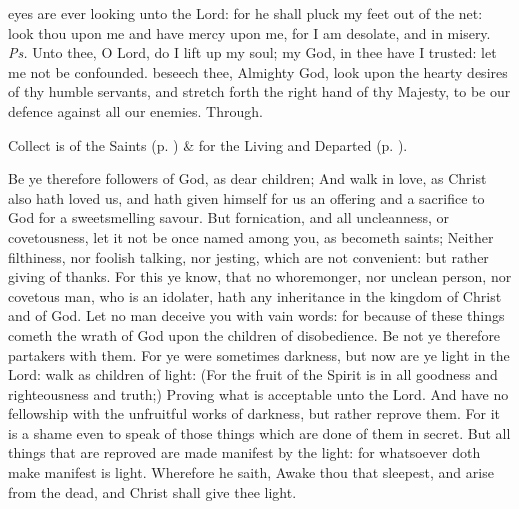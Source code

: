 \introit
{} eyes are ever looking unto the Lord: for he shall pluck my feet out of the net: look thou upon me and have mercy upon me, for I am desolate, and in misery. \textit{Ps.} Unto thee, O Lord, do I lift up my soul; my God, in thee have I trusted: let me not be confounded.
\collect
{} beseech thee, Almighty God, look upon the hearty desires of thy humble servants, and stretch forth the right hand of thy Majesty, to be our defence against all our enemies. Through.
\begin{rubric}
     Collect is of the Saints (p. \pageref{SPSaints}) \&  for the Living and Departed (p. \pageref{SPLivingDeparted}).
\end{rubric}
 Be ye therefore followers of God, as dear children; And walk in love, as Christ also hath loved us, and hath given himself for us an offering and a sacrifice to God for a sweetsmelling savour. But fornication, and all uncleanness, or covetousness, let it not be once named among you, as becometh saints; Neither filthiness, nor foolish talking, nor jesting, which are not convenient: but rather giving of thanks. For this ye know, that no whoremonger, nor unclean person, nor covetous man, who is an idolater, hath any inheritance in the kingdom of Christ and of God. Let no man deceive you with vain words: for because of these things cometh the wrath of God upon the children of disobedience. Be not ye therefore partakers with them. For ye were sometimes darkness, but now are ye light in the Lord: walk as children of light: (For the fruit of the Spirit is in all goodness and righteousness and truth;) Proving what is acceptable unto the Lord. And have no fellowship with the unfruitful works of darkness, but rather reprove them. For it is a shame even to speak of those things which are done of them in secret. But all things that are reproved are made manifest by the light: for whatsoever doth make manifest is light. Wherefore he saith, Awake thou that sleepest, and arise from the dead, and Christ shall give thee light.



